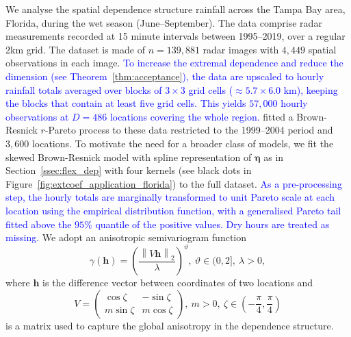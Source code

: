 \documentclass[12pt]{article}
\newcommand{\PZ}{\textcolor{blue}}
\begin{document}
We analyse the spatial dependence structure rainfall across the Tampa Bay area, Florida, during the wet season (June--September).
The data comprise radar measurements recorded at 15 minute intervals between 1995--2019, over a regular 2km grid. The dataset is made of $n=139,881$ radar images with $4,449$ spatial observations in each image.
\PZ{To increase the extremal dependence and reduce the dimension (see Theorem~\ref{thm:acceptance}), the data are upscaled to hourly rainfall totals averaged over blocks of $3\times3$ grid cells ($\approx5.7\times6.0$ km), keeping the blocks that contain at least five grid cells. This yields $57,000$ hourly observations at $D=486$ locations covering the whole region.}
%
\cite{deFondeville.Davison:2018} fitted a Brown-Resnick $r$-Pareto process to these data restricted to the 1999--2004 period and $3,600$ locations. 
%
To motivate the need for a broader class of models, we fit the skewed Brown-Resnick model with spline representation of $\bm\eta$ as in Section~\ref{ssec:flex_dep} with four kernels (see black dots in Figure~\ref{fig:extcoef_application_florida}) to the full dataset.
%
\PZ{As a pre-processing step, the hourly totals are marginally transformed to unit Pareto scale at each location using the empirical distribution function, with a generalised Pareto tail fitted above the $95\%$ quantile of the positive values. Dry hours are treated as missing.}
%
We adopt an anisotropic semivariogram function
%
\begin{equation}
    \label{eq:semivar}
    \gamma(\bm h) = \left(\frac{\left\| V \bm h\right\|_2}{\lambda}\right)^\vartheta, \:\vartheta\in(0,2],\:\lambda>0,
\end{equation}
%
where $\bm h$ is the difference vector between coordinates of two locations and 
%
\begin{equation*}
\label{eq:aniso_mat}
    V = \begin{pmatrix}
    \cos\zeta & - \sin\zeta\\
    m\sin\zeta &  m\cos\zeta
    \end{pmatrix},\: m >0 , \:\zeta\in (-\frac{\pi}{4},\frac{\pi}{4})
\end{equation*}
is a matrix used to capture the global anisotropy in the dependence structure.
\end{document}
